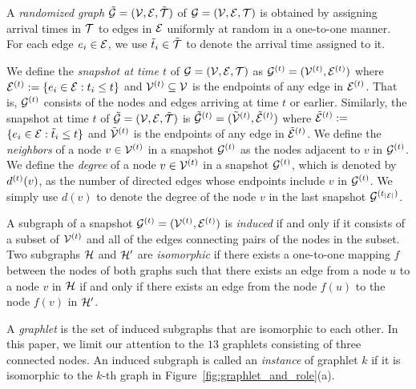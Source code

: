 A \textit{randomized graph} $\mathcal{\tilde{G}}= (\mathcal{V}, \mathcal{E}, \mathcal{\tilde{T}})$ of $\mathcal{G}=(\mathcal{V},\mathcal{E}, \mathcal{T})$ is obtained by assigning arrival times in $\mathcal{T}$ to edges in $\mathcal{E}$ uniformly at random in a one-to-one manner. For each edge $e_i\in \mathcal{E}$, we use $\tilde{t}_i\in \mathcal{\tilde{T}}$ to denote the arrival time assigned to it. %

We define the \textit{snapshot at time $t$} of $\mathcal{G}=(\mathcal{V}, \mathcal{E}, \mathcal{T})$ as $\mathcal{G}^{(t)}=(\mathcal{V}^{(t)},\mathcal{E}^{(t)})$ where $\mathcal{E}^{(t)}:=\{e_i\in \mathcal{E}:t_i \leq t\}$ and $\mathcal{V}^{(t)}\subseteq \mathcal{V}$ is the endpoints of any edge in $\mathcal{E}^{(t)}$.
That is, $\mathcal{G}^{(t)}$ consists of the nodes and edges arriving at time $t$ or earlier. Similarly, the snapshot at time $t$ of $\mathcal{\tilde{G}}= (\mathcal{V}, \mathcal{E}, \mathcal{\tilde{T}})$ is 
$\mathcal{\tilde{G}}^{(t)}=(\mathcal{\tilde{V}}^{(t)},\mathcal{\tilde{E}}^{(t)})$ where $\mathcal{\tilde{E}}^{(t)}:=$ $\{e_i\in \mathcal{E}:\tilde{t}_i \leq t\}$ and $\mathcal{\tilde{V}}^{(t)}$ is the endpoints of any edge in $\mathcal{\tilde{E}}^{(t)}$. 
We define the \textit{neighbors} of a node $v\in\mathcal{V}^{(t)}$ in a snapshot $\mathcal{G}^{(t)}$ as the nodes adjacent to $v$ in $\mathcal{G}^{(t)}$.  %
We define the \textit{degree} of a node $v\in\mathcal{V}^{(t)}$ in a snapshot $\mathcal{G}^{(t)}$, which is denoted by $d^{(t)}(v)$, as the number of directed edges whose endpoints include $v$ in $\mathcal{G}^{(t)}$.
We simply use $d(v)$ to denote the degree of the node $v$ in the last snapshot $\mathcal{G}^{(t_{|\mathcal{E}|})}$.

A subgraph of a snapshot $\mathcal{G}^{(t)}=(\mathcal{V}^{(t)},\mathcal{E}^{(t)})$ is \textit{induced} if and only if it consists of a subset of $\mathcal{V}^{(t)}$ and all of the edges connecting pairs of the nodes in the subset. 
Two subgraphs $\mathcal{H}$ and $\mathcal{H'}$ are \textit{isomorphic} if there exists a one-to-one mapping $f$ between the nodes of both graphs such that there exists an edge from a node $u$ to a node $v$ in $\mathcal{H}$ if and only if there exists an edge from the node $f(u)$ to the node $f(v)$ in $\mathcal{H'}$.

A \textit{graphlet} is the set of induced subgraphs that are isomorphic to each other.
In this paper, we limit our attention to the $13$ graphlets consisting of three connected nodes. %
An induced subgraph is called an \textit{instance} of graphlet $k$ if it is isomorphic to the $k$-th graph in Figure~\ref{fig:graphlet_and_role}(a).

